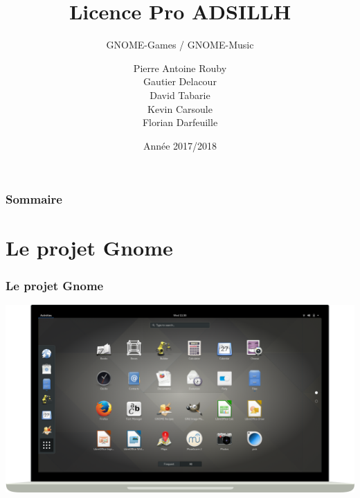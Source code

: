 \documentclass{beamer}
\title{Licence Pro ADSILLH}
\subtitle{GNOME-Games / GNOME-Music}
\author{Pierre Antoine Rouby\\Gautier Delacour\\
  David Tabarie\\Kevin Carsoule\\Florian Darfeuille}
\date{Année 2017/2018}
\begin{document}
\frame{\titlepage}

\begin{frame}
  \frametitle{Sommaire}
  \tableofcontents
\end{frame}

\section{Le projet Gnome}
\begin{frame}
  \frametitle{Le projet Gnome}
  \includegraphics[scale=0.235]{images/GnomeScreen.png}
\end{frame}
\end{document}
